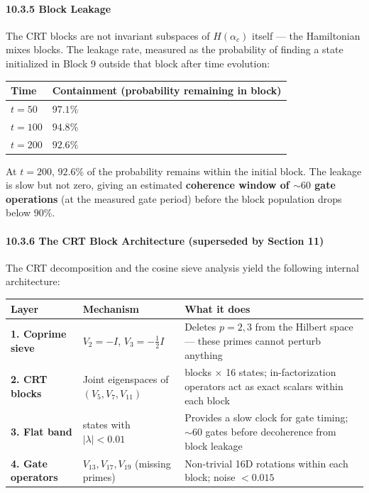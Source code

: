 \documentclass[11pt,letterpaper]{article}
\theoremstyle{definition}
\theoremstyle{remark}
\begin{document}
\paragraph{10.3.5 Block Leakage}\label{block-leakage}

The CRT blocks are not invariant subspaces of $H(\alpha_c)$ itself --- the Hamiltonian mixes blocks. The leakage rate, measured as the probability of finding a state initialized in Block 9 outside that block after time evolution:

\begin{longtable}[]{@{}ll@{}}
\toprule
Time & Containment (probability remaining in block) \\
\midrule
\endhead
\bottomrule
$t = 50$ & $97.1\%$ \\
$t = 100$ & $94.8\%$ \\
$t = 200$ & $92.6\%$ \\
\end{longtable}

At $t = 200$, $92.6\%$ of the probability remains within the initial block. The leakage is slow but not zero, giving an estimated \textbf{coherence window of $\sim 60$ gate operations} (at the measured gate period) before the block population drops below $90\%$.

\paragraph{10.3.6 The CRT Block Architecture (superseded by Section 11)}\label{the-crt-block-architecture-superseded-by-section-11}

The CRT decomposition and the cosine sieve analysis yield the following internal architecture:

\begin{longtable}[]{@{}
  >{\raggedright\arraybackslash}p{}
  >{\raggedright\arraybackslash}p{}
  >{\raggedright\arraybackslash}p{}@{}}
\toprule
Layer & Mechanism & What it does \\
\midrule
\endhead
\bottomrule
\textbf{1. Coprime sieve} & $V_2 = -I$, $V_3 = -\tfrac{1}{2}I$ & Deletes $p = 2, 3$ from the Hilbert space --- these primes cannot perturb anything \\
\textbf{2. CRT blocks} & Joint eigenspaces of $(V_5, V_7, V_{11})$ & 30 blocks $\times$ 16 states; in-factorization operators act as exact scalars within each block \\
\textbf{3. Flat band} & 473 states with $\lvert\lambda\rvert < 0.01$ & Provides a slow clock for gate timing; $\sim 60$ gates before decoherence from block leakage \\
\textbf{4. Gate operators} & $V_{13}, V_{17}, V_{19}$ (missing primes) & Non-trivial 16D rotations within each block; noise $< 0.015$ \\
\end{longtable}
\end{document}
